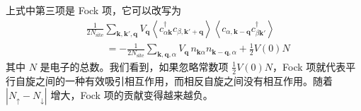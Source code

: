 
上式中第三项是 Fock 项，它可以改写为
\begin{align*}
&\frac{1}{2N_{\mathrm{site}}}\sum_{\pmb{k},\pmb{k}',\pmb{q}} V_{\pmb{q}} \left\langle c^{\dagger}_{\alpha\pmb{k}} c_{\beta,\pmb{k}'+\pmb{q}} \right\rangle \left\langle c_{\alpha,\pmb{k}-\pmb{q}} c^{\dagger}_{\beta\pmb{k}'} \right\rangle \\
&\qquad = -\frac{1}{2N_{\mathrm{site}}}\sum_{\pmb{k},\pmb{q},\alpha} V_{\pmb{q}}\, n_{\pmb{k}\alpha} n_{\pmb{k}-\pmb{q},\alpha} + \frac{1}{2} V(0) N
\end{align*}
其中 $N$ 是电子的总数。我们看到，如果忽略常数项 $\frac{1}{2}V(0)N$，Fock 项就代表平行自旋之间的一种有效吸引相互作用，而相反自旋之间没有相互作用。随着 $|N_{\uparrow}-N_{\downarrow}|$ 增大，Fock 项的贡献变得越来越负。

